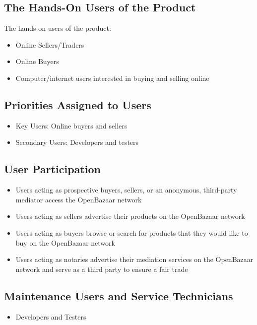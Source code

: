 \documentclass{article}
\begin{document}
\subsection{The Hands-On Users of the Product}
The hands-on users of the product:
\begin{itemize}
\item
Online Sellers/Traders

\item
Online Buyers

\item
Computer/internet users interested in buying and selling online
\end{itemize}

\subsection{Priorities Assigned to Users}
\begin{itemize}
\item
Key Users: Online buyers and sellers

\item
Secondary Users: Developers and testers
\end{itemize}

\subsection{User Participation}
\begin{itemize}
\item 
Users acting as prospective buyers, sellers, or an anonymous, third-party mediator access the OpenBazaar network		

\item
Users acting as sellers advertise their products on the OpenBazaar network

\item
Users acting as buyers browse or search for products that they would like to buy on the OpenBazaar network

\item
Users acting as notaries advertise their mediation services on the OpenBazaar network and serve as a third party to ensure a fair trade
\end{itemize}

\subsection{Maintenance Users and Service Technicians}
\begin{itemize}
\item
Developers and Testers
\end{itemize}
\end{document}
